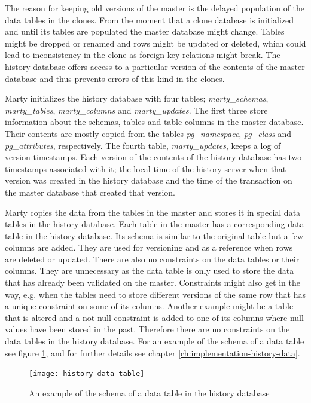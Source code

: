 The reason for keeping old versions of the master is the delayed population of the data tables in the clones.
From the moment that a clone database is initialized and until its tables are populated the master database might change.
Tables might be dropped or renamed and rows might be updated or deleted, which could lead to inconsistency in the clone as foreign key relations might break.
The history database offers access to a particular version of the contents of the master database and thus prevents errors of this kind in the clones.

Marty initializes the history database with four tables; \textit{marty\_schemas}, \textit{marty\_tables}, \textit{marty\_columns} and \textit{marty\_updates}.
The first three store information about the schemas, tables and table columns in the master database.
Their contents are mostly copied from the tables \textit{pg\_namespace}, \textit{pg\_class} and \textit{pg\_attributes}, respectively.
The fourth table, \textit{marty\_updates}, keeps a log of version timestamps.
Each version of the contents of the history database has two timestamps associated with it; the local time of the history server when that version was created in the history database and the time of the transaction on the master database that created that version.

Marty copies the data from the tables in the master and stores it in special data tables in the history database.
Each table in the master has a corresponding data table in the history database.
Its schema is similar to the original table but a few columns are added.
They are used for versioning and as a reference when rows are deleted or updated.
There are also no constraints on the data tables or their columns.
They are unnecessary as the data table is only used to store the data that has already been validated on the master.
Constraints might also get in the way, e.g. when the tables need to store different versions of the same row that has a unique constraint on some of its columns.
Another example might be a table that is altered and a not-null constraint is added to one of its columns where null values have been stored in the past.
Therefore there are no constraints on the data tables in the history database.
For an example of the schema of a data table see figure \ref{fig:history-data-table}, and for further details see chapter \ref{ch:implementation-history-data}.

\begin{figure}[h!]
  \centering
    \texttt{[image: history-data-table]}
  \caption{An example of the schema of a data table in the history database}
  \label{fig:history-data-table}
\end{figure}

